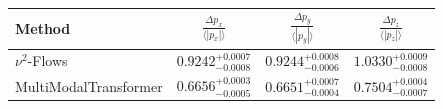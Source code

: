     \begin{tabular}{lccc}
        \toprule
        Method & $\frac{\Delta p_x}{\langle |p_x|\rangle}$ & $\frac{\Delta p_y}{\langle |p_y|\rangle}$ & $\frac{\Delta p_z}{\langle |p_z|\rangle}$ \\
        \midrule
        $\nu^2$-Flows & $0.9242^{+0.0007}_{-0.0008}$ & $0.9244^{+0.0008}_{-0.0006}$ & $1.0330^{+0.0009}_{-0.0008}$ \\
        MultiModalTransformer & $0.6656^{+0.0003}_{-0.0005}$ & $0.6651^{+0.0007}_{-0.0004}$ & $0.7504^{+0.0004}_{-0.0007}$ \\
        \bottomrule
    \end{tabular}